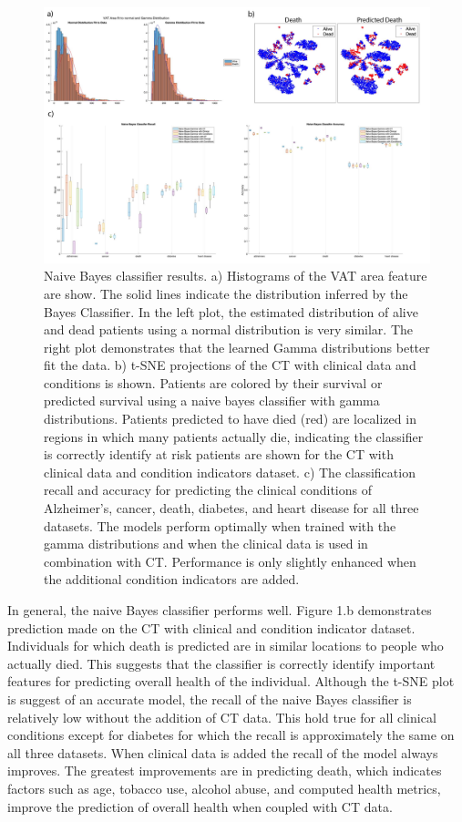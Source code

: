 \documentclass{article}
\begin{document}
\begin{figure}[ht!]
\centering
\includegraphics[width=.95 \textwidth]{results/figure_1.jpg}
\caption{Naive Bayes classifier results. a) Histograms of the VAT area feature are show. The solid lines indicate the distribution inferred by the Bayes Classifier. In the left plot, the estimated distribution of alive and dead patients using a normal distribution is very similar. The right plot demonstrates that the learned Gamma distributions better fit the data. b)  t-SNE projections of the CT with clinical data and conditions is shown. Patients are colored by their survival or predicted survival using a naive bayes classifier with gamma distributions.  Patients predicted to have died (red) are localized in regions in which many patients actually die, indicating the classifier is correctly identify at risk patients are shown for the CT with clinical data and condition indicators dataset. c) The classification recall and accuracy for predicting the clinical conditions of Alzheimer's, cancer, death,  diabetes, and heart disease for all three datasets. The models perform optimally when trained with the gamma distributions and when the clinical data is used in combination with CT.  Performance is only slightly enhanced when the additional condition indicators are added.}
\end{figure} 

In general, the naive Bayes classifier performs well. Figure 1.b demonstrates prediction made on the CT with clinical and condition indicator dataset. Individuals for which death is predicted are in similar locations to people who actually died. This suggests that the classifier is correctly identify important features for predicting overall health of the individual. Although the t-SNE plot is suggest of an accurate model, the recall of the naive Bayes classifier is relatively low without the addition of CT data. This hold true for all clinical conditions except for diabetes for which the recall is approximately the same on all three datasets. When clinical data is added the recall of the model always improves. The greatest improvements are in predicting death, which indicates factors such as age, tobacco use, alcohol abuse, and computed health metrics, improve the prediction of overall health when coupled with CT data. 
\end{document}
